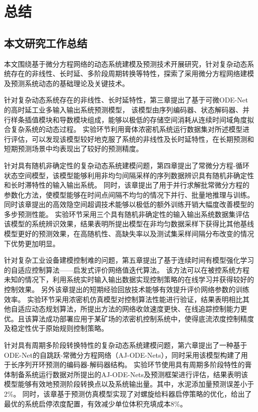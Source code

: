 \chapter{总结}
\section{本文研究工作总结}
本文围绕基于微分方程网络的动态系统建模及预测技术开展研究，针对复杂动态系统存在的非线性、长时延、多阶段周期转换等特性，探索了采用微分方程网络建模及预测系统动态的基础理论及关键技术。

针对复杂动态系统存在的非线性、长时延特性，第三章提出了基于可微ODE-Net的高时延工业多输入输出系统预测模型，
该模型由序列编码器、状态解码器、并行样条插值模块和导数模块组成，能够以极低的存储空间消耗从连续时间域角度拟合复杂系统的动态过程。
实验环节利用膏体浓密机系统运行数据集对所述模型进行评估，可以发现该模型较好地克服了系统的非线性及长时延特性，在长期预测和短期预测场景中均表现出了较好的预测精度。

针对具有随机非确定性的复杂动态系统建模问题，第四章提出了常微分方程-循环状态空间模型，该模型能够利用非均匀间隔采样的序列数据辨识具有随机非确定性和长时滞特性的输入输出系统。
同时，该章提出了用于并行求解批常微分方程的参数化方法，使模型能够在时间点间隔不均匀的情况下并行、批量地推理与训练。同时该章提出的高效隐空间超调技术能够以极低的额外训练开销大幅度改善模型的多步预测性能。
实验环节采用三个具有随机非确定性的输入输出系统数据集评估该模型的系统辨识效果，结果表明所提出模型在非均匀数据采样下获得比其他基线模型更好的预测效果，在高随机性、高缺失率以及测试集采样间隔分布改变的情况下优势更加明显。

针对复杂工业设备建模控制难的问题，第五章提出了基于连续时间有模型强化学习的自适应控制算法——启发式评价网络值迭代算法。
该方法可以在被控系统方程未知的情况下，利用系统实时输入输出数据实现控制策略的在线学习并获得较好的控制效果。
另外该章提出的短期经验回放技术能够有效提升评价网络参数的训练效率。
实验环节采用浓密机仿真模型对控制算法性能进行验证，结果表明相比其他自适应动态规划算法，所提出方法的网络收敛速度更快、在线追踪控制能力更优。且该算法成功部署应用于某矿场的浓密机控制系统中，使得底流浓度控制精度及稳定性优于原始规则控制策略。

针对具有周期多阶段转换特性的复杂动态系统建模问题，第六章提出了一种基于ODE-Net的自跳跃-常微分方程网络（AJ-ODE-Nets），同时采用该模型构建了用于长序列开环预测的编码器-解码器结构。
实验环节使用具有周期多阶段特性的膏体制备系统运行数据对所提出的AJ-ODE-Nets及预测框架进行评估，结果表明该模型能够有效地预测阶段转换点以及系统输出量。其中，水泥添加量预测误差小于2\%。
同时，该章基于预测仿真模型实现了对螺旋给料器启停策略的优化，给出了最优的系统启停浓度配置，有效减少单位体积充填成本8\%。

